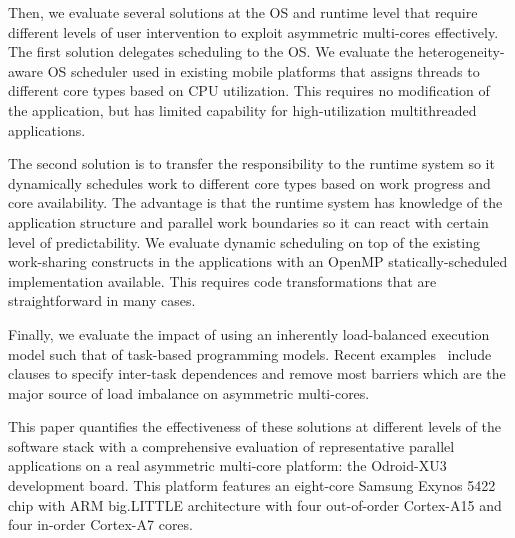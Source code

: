 Then, we evaluate several solutions at the OS and runtime level that require different
levels of user intervention to exploit asymmetric multi-cores effectively. The first
solution delegates scheduling to the OS. We evaluate the heterogeneity-aware
OS scheduler used in existing mobile platforms that assigns threads to different
core types based on CPU utilization. This requires no modification of the
application, but has limited capability for high-utilization multithreaded applications.



The second solution is to transfer the responsibility to the runtime system so it 
dynamically schedules work to different core types based on work progress and core 
availability. The advantage is that the runtime system has knowledge of the application 
structure and parallel work boundaries so it can react with certain level of predictability. 
We evaluate dynamic scheduling on top of the existing work-sharing constructs in the applications 
with an OpenMP statically-scheduled implementation available. This requires code transformations 
that are straightforward in many cases.

Finally, we evaluate the impact of using an inherently load-balanced execution model such 
that of task-based programming models. 
Recent examples~\cite{Ayguade:TPDS2009, OpenMP4.0:Manual2013, OmpSs_PPL11, Zuckerman:EXADAPT2011, Bauer.2012.SC, Vandierendonck:PACT2011, Vandierendonck:Hyperq} 
include clauses to specify inter-task dependences and remove most barriers which are the major 
source of load imbalance on asymmetric multi-cores.


This paper quantifies the effectiveness of these solutions at different levels of the software stack
with a comprehensive evaluation of representative parallel applications on a real 
asymmetric multi-core platform: the Odroid-XU3 development board. This platform features an 
eight-core Samsung Exynos 5422 chip with ARM big.LITTLE architecture with 
four out-of-order Cortex-A15 and four in-order Cortex-A7 cores.

